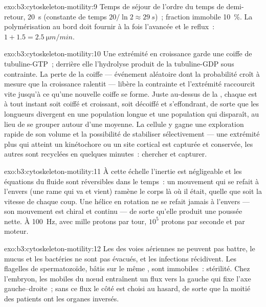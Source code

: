 \begin{solution}{exo:b3:cytoskeleton-motility:9}
Temps de séjour de l'ordre du temps de demi-retour, \qty{20}{s}
(constante de temps $20/\ln 2 \approx \qty{29}{s}$)~; fraction immobile
\qty{10}{\%}. La polymérisation au bord doit fournir à la fois
l'avancée et le reflux~: $1 + 1.5 = \qty{2.5}{\micro m/min}$.
\end{solution}

\begin{solution}{exo:b3:cytoskeleton-motility:10}
Une extrémité en croissance garde une coiffe de tubuline-GTP~; derrière
elle l'hydrolyse produit de la tubuline-GDP sous contrainte. La perte
de la coiffe --- événement aléatoire dont la probabilité croît à mesure
que la croissance ralentit --- libère la contrainte et l'extrémité
raccourcit vite jusqu'à ce qu'une nouvelle coiffe se forme. Juste
au-dessus de la , chaque  est à tout
instant soit coiffé et croissant, soit décoiffé et s'effondrant, de
sorte que les longueurs divergent en une population longue et une
population qui disparaît, au lieu de se grouper autour d'une moyenne.
La cellule y gagne une exploration rapide de son volume et la
possibilité de stabiliser sélectivement --- une extrémité plus qui
atteint un kinétochore ou un site cortical est capturée et conservée,
les autres sont recyclées en quelques minutes~: chercher et capturer.
\end{solution}

\begin{solution}{exo:b3:cytoskeleton-motility:11}
À cette échelle l'inertie est négligeable et les équations du fluide
sont réversibles dans le temps~: un mouvement qui se refait à l'envers
(une rame qui va et vient) ramène le corps là où il était, quelle que
soit la vitesse de chaque coup. Une hélice en rotation ne se refait
jamais à l'envers --- son mouvement est chiral et continu --- de sorte
qu'elle produit une poussée nette. À \qty{100}{Hz}, avec mille protons
par tour, $10^{5}$ protons par seconde et par moteur.
\end{solution}

\begin{solution}{exo:b3:cytoskeleton-motility:12}
Les  des voies aériennes ne peuvent pas battre, le mucus et les
bactéries ne sont pas évacués, et les infections récidivent. Les
flagelles de spermatozoïde, bâtis sur le même , sont
immobiles~: stérilité. Chez l'embryon, les  mobiles du nœud
entraînent un flux vers la gauche qui fixe l'axe gauche--droite~; sans
ce flux le côté est choisi au hasard, de sorte que la moitié des
patients ont les organes inversés.
\end{solution}


